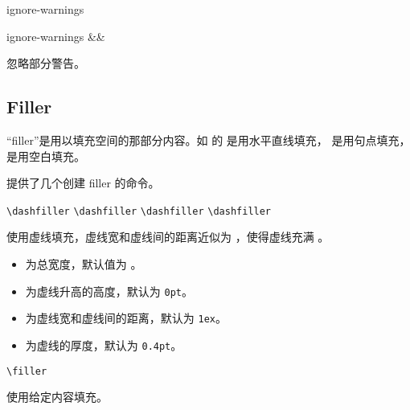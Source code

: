 \documentclass[twoside]{book}
\def\xampletext{\par}
\def\xampleprint{\xamplecode \xampleline \xampletext}
\begin{document}
\begin{keyval}[path=frame]{ignore-warnings}
  \begin{syntax}
    ignore-warnings &&
  \end{syntax}
忽略部分警告。
\end{keyval}


\subsection{Filler}

“filler”是用以填充空间的那部分内容。如 \LaTeXe 的  是用水平直线填充，
 是用句点填充， 是用空白填充。

 提供了几个创建 filler 的命令。

\begin{function}{\dashfiller}
  \begin{syntax}
    \verb|\dashfiller|
    \verb|\dashfiller| 
    \verb|\dashfiller| 
    \verb|\dashfiller|  
  \end{syntax}
使用虚线填充，虚线宽和虚线间的距离近似为 ，使得虚线充满 。

\begin{itemize}[nosep]
  \item {} 为总宽度，默认值为 。
  \item {} 为虚线升高的高度，默认为 \texttt{0pt}。
  \item {} 为虚线宽和虚线间的距离，默认为 \texttt{1ex}。
  \item {} 为虚线的厚度，默认为 \texttt{0.4pt}。
\end{itemize}
\end{function}

\begin{xample}
\noindent\llap{|}\dashfiller \par %
\noindent\llap{|}\dashfiller [.5ex] \par %
\noindent\llap{|}\dashfiller [.5ex][3pt] \par 
\stopxamplecode
\xampleprint 
\end{xample}

\begin{function}{\filler}
  \begin{syntax}
    \verb|\filler| 
  \end{syntax}
使用给定内容填充。
\end{function}
\end{document}
